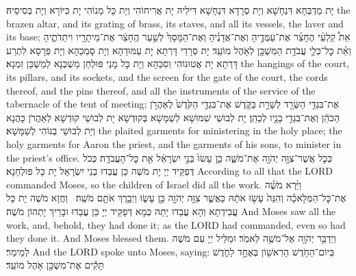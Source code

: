 {{יָת מַדְבְּחָא דִּנְחָשָׁא וְיָת סְרָדָא דִּנְחָשָׁא דִּילֵיהּ יָת אֲרִיחוֹהִי וְיָת כָּל מָנוֹהִי יָת כִּיּוֹרָא וְיָת בְּסִיסֵיהּ׃}
{the brazen altar, and its grating of brass, its staves, and all its vessels, the laver and its base;}{}
{אֵת֩ קַלְעֵ֨י הֶחָצֵ֜ר אֶת־עַמֻּדֶ֣יהָ וְאֶת־אֲדָנֶ֗יהָ וְאֶת־הַמָּסָךְ֙ לְשַׁ֣עַר הֶֽחָצֵ֔ר אֶת־מֵיתָרָ֖יו וִיתֵדֹתֶ֑יהָ וְאֵ֗ת כׇּל־כְּלֵ֛י עֲבֹדַ֥ת הַמִּשְׁכָּ֖ן לְאֹ֥הֶל מוֹעֵֽד׃}
{יָת סְרָדֵי דָּרְתָא יָת עַמּוּדַהָא וְיָת סָמְכַהָא וְיָת פְּרָסָא לִתְרַע דָּרְתָא יָת אֲטוּנוֹהִי וְסִכַּהָא וְיָת כָּל מָנֵי פּוּלְחַן מַשְׁכְּנָא לְמַשְׁכַּן זִמְנָא׃}
{the hangings of the court, its pillars, and its sockets, and the screen for the gate of the court, the cords thereof, and the pins thereof, and all the instruments of the service of the tabernacle of the tent of meeting;}{}
{אֶת־בִּגְדֵ֥י הַשְּׂרָ֖ד לְשָׁרֵ֣ת בַּקֹּ֑דֶשׁ אֶת־בִּגְדֵ֤י הַקֹּ֙דֶשׁ֙ לְאַהֲרֹ֣ן הַכֹּהֵ֔ן וְאֶת־בִּגְדֵ֥י בָנָ֖יו לְכַהֵֽן׃}
{יָת לְבוּשֵׁי שִׁמּוּשָׁא לְשַׁמָּשָׁא בְּקוּדְשָׁא יָת לְבוּשֵׁי קוּדְשָׁא לְאַהֲרֹן כָּהֲנָא וְיָת לְבוּשֵׁי בְנוֹהִי לְשַׁמָּשָׁא׃}
{the plaited garments for ministering in the holy place; the holy garments for Aaron the priest, and the garments of his sons, to minister in the priest’s office.}{}
{כְּכֹ֛ל אֲשֶׁר־צִוָּ֥ה יְהֹוָ֖ה אֶת־מֹשֶׁ֑ה כֵּ֤ן עָשׂוּ֙ בְּנֵ֣י יִשְׂרָאֵ֔ל אֵ֖ת כׇּל־הָעֲבֹדָֽה׃}
{כְּכֹל דְּפַקֵּיד יְיָ יָת מֹשֶׁה כֵּן עֲבַדוּ בְנֵי יִשְׂרָאֵל יָת כָּל פּוּלְחָנָא׃}
{According to all that the LORD commanded Moses, so the children of Israel did all the work.}{}
{וַיַּ֨רְא מֹשֶׁ֜ה אֶת־כׇּל־הַמְּלָאכָ֗ה וְהִנֵּה֙ עָשׂ֣וּ אֹתָ֔הּ כַּאֲשֶׁ֛ר צִוָּ֥ה יְהֹוָ֖ה כֵּ֣ן עָשׂ֑וּ וַיְבָ֥רֶךְ אֹתָ֖ם מֹשֶֽׁה׃ \petucha 
{}}
{וַחֲזָא מֹשֶׁה יָת כָּל עֲבִידְתָא וְהָא עֲבַדוּ יָתַהּ כְּמָא דְּפַקֵּיד יְיָ כֵּן עֲבַדוּ וּבָרֵיךְ יָתְהוֹן מֹשֶׁה׃}
{And Moses saw all the work, and, behold, they had done it; as the LORD had commanded, even so had they done it. And Moses blessed them.}{}
\newperek
{}%
{וַיְדַבֵּ֥ר יְהֹוָ֖ה אֶל־מֹשֶׁ֥ה לֵּאמֹֽר׃}
{וּמַלֵּיל יְיָ עִם מֹשֶׁה לְמֵימַר׃}
{And the LORD spoke unto Moses, saying:}{}
{בְּיוֹם־הַחֹ֥דֶשׁ הָרִאשׁ֖וֹן בְּאֶחָ֣ד לַחֹ֑דֶשׁ תָּקִ֕ים אֶת־מִשְׁכַּ֖ן אֹ֥הֶל מוֹעֵֽד׃}
}
